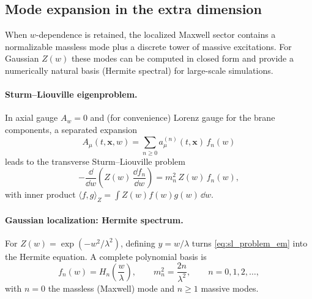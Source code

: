 \documentclass[11pt]{article}
\newcommand{\x}{\mathbf{x}}     %
\newcommand{\A}{A}              %
\newcommand{\Z}{Z}              %
\begin{document}
\subsection{Mode expansion in the extra dimension}
\label{sec:kk_modes}

When \(w\)-dependence is retained, the localized Maxwell sector contains a
normalizable massless mode plus a discrete tower of massive excitations. For
Gaussian \(\Z(w)\) these modes can be computed in closed form and provide a
numerically natural basis (Hermite spectral) for large-scale simulations.

\paragraph{Sturm--Liouville eigenproblem.}
In axial gauge \(A_w=0\) and (for convenience) Lorenz gauge for the brane
components, a separated expansion
\begin{equation}
\A_\mu(t,\x,w)=\sum_{n\ge 0} a_\mu^{(n)}(t,\x)\,f_n(w)
\label{eq:kk_expansion_em}
\end{equation}
leads to the transverse Sturm--Liouville problem
\begin{equation}
-\frac{\dd}{\dd w}\!\left(\Z(w)\,\frac{\dd f_n}{\dd w}\right)
= m_n^2\,\Z(w)\,f_n(w),
\label{eq:sl_problem_em}
\end{equation}
with inner product \(\langle f,g\rangle_{\Z}=\int \Z(w)f(w)g(w)\,\dd w\).

\paragraph{Gaussian localization: Hermite spectrum.}
For \(\Z(w)=\exp(-w^2/\lambda^2)\), defining \(y=w/\lambda\) turns
\eqref{eq:sl_problem_em} into the Hermite equation. A complete polynomial basis is
\begin{equation}
f_n(w)=H_n\!\left(\frac{w}{\lambda}\right),
\qquad
m_n^2=\frac{2n}{\lambda^2},
\qquad n=0,1,2,\ldots,
\label{eq:hermite_spectrum_em}
\end{equation}
with \(n=0\) the massless (Maxwell) mode and \(n\ge 1\) massive modes.
\end{document}
